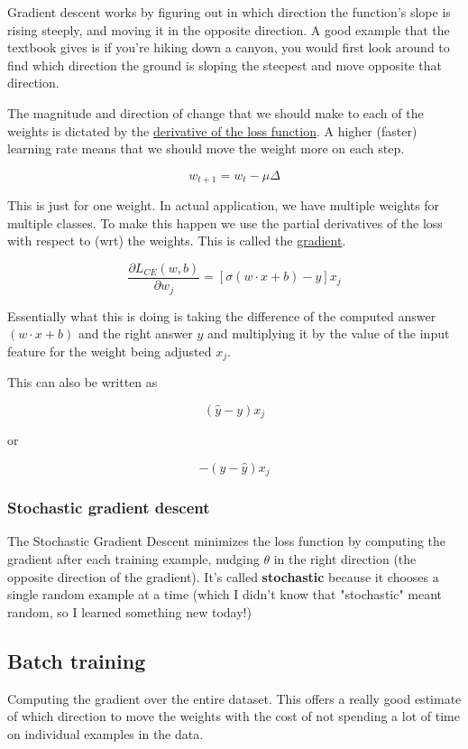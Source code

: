 \documentclass[11pt]{article}
\begin{document}
Gradient descent works by figuring out in which direction the function's slope
is rising steeply, and moving it in the opposite direction. A good example that
the textbook gives is if you're hiking down a canyon, you would first look
around to find which direction the ground is sloping the steepest and move
opposite that direction.

The magnitude and direction of change that we should make to each of the weights
is dictated by the \ul{derivative of the loss function}. A higher (faster)
learning rate means that we should move the weight more on each step.

\[
	w_{t+1} = w_t - \mu\Delta
\]

This is just for one weight. In actual application, we have multiple weights for
multiple classes. To make this happen we use the partial derivatives of the loss
with respect to (wrt) the weights. This is called the \ul{gradient}.

\[
	\frac{\partial L_{CE}(w,b)}{\partial w_j} = [\sigma(w \cdot x + b)-y]x_j
\]

Essentially what this is doing is taking the difference of the computed answer
$(w \cdot x + b)$ and the right answer $y$ and multiplying it by the value of
the input feature for the weight being adjusted $x_j$.

This can also be written as

\[
	(\hat{y}-y)x_j
\]

or

\[
	-(y-\hat{y})x_j
\]

\subsubsection{Stochastic gradient descent}

The Stochastic Gradient Descent minimizes the loss function by computing the
gradient after each training example, nudging $\theta$ in the right direction
(the opposite direction of the gradient). It's called \textbf{stochastic}
because it chooses a single random example at a time (which I didn't know that
"stochastic" meant random, so I learned something new today!)


\subsection{Batch training}

Computing the gradient over the entire dataset. This offers a really good
estimate of which direction to move the weights with the cost of not spending a
lot of time on individual examples in the data.
\end{document}
